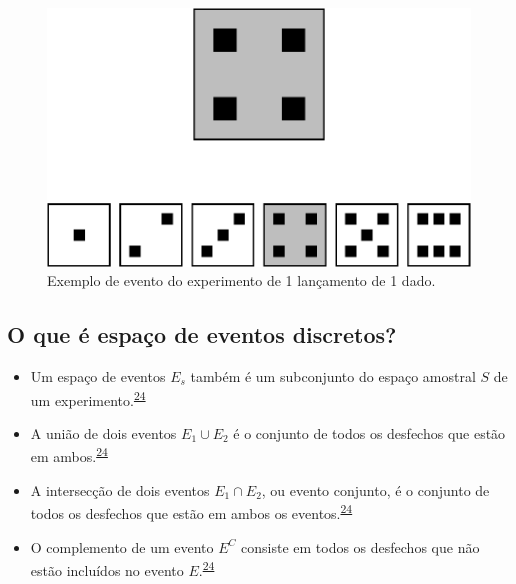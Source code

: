 \documentclass[
  a4paper,
]{book}
\begin{document}
\begin{figure}

{\centering \includegraphics{Ciencia-com-R_files/figure-latex/evento-dado-1} 

}

\caption{Exemplo de evento do experimento de 1 lançamento de 1 dado.}\label{fig:evento-dado}
\end{figure}

\hypertarget{o-que-uxe9-espauxe7o-de-eventos-discretos}{%
\subsection{O que é espaço de eventos discretos?}\label{o-que-uxe9-espauxe7o-de-eventos-discretos}}

\begin{itemize}
\item
  Um espaço de eventos \(E_{s}\) também é um subconjunto do espaço amostral \(S\) de um experimento.\textsuperscript{\protect\hyperlink{ref-grami2023}{24}}
\item
  A união de dois eventos \(E_{1} \cup E_{2}\) é o conjunto de todos os desfechos que estão em ambos.\textsuperscript{\protect\hyperlink{ref-grami2023}{24}}
\item
  A intersecção de dois eventos \(E_{1} \cap E_{2}\), ou evento conjunto, é o conjunto de todos os desfechos que estão em ambos os eventos.\textsuperscript{\protect\hyperlink{ref-grami2023}{24}}
\item
  O complemento de um evento \(E^C\) consiste em todos os desfechos que não estão incluídos no evento \(E\).\textsuperscript{\protect\hyperlink{ref-grami2023}{24}}
\end{itemize}
\end{document}
